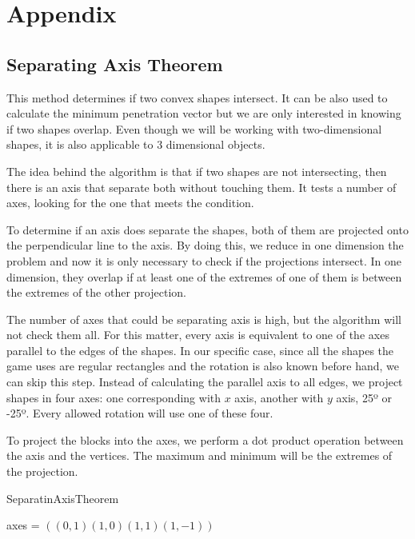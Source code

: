 \chapter{Appendix}\label{ch:appendix}

\section{Separating Axis Theorem}

This method determines if two convex shapes intersect. It can be also used to calculate the minimum penetration vector but we are only interested in knowing if two shapes overlap. Even though we will be working with two-dimensional shapes, it is also applicable to 3 dimensional objects. \cite{ericson2004real}

The idea behind the algorithm is that if two shapes are not intersecting, then there is an axis that separate both without touching them. It tests a number of axes, looking for the one that meets the condition. 

To determine if an axis does separate the shapes, both of them are projected onto the perpendicular line to the axis. By doing this, we reduce in one dimension the problem and now it is only necessary to check if the projections intersect. In one dimension, they overlap if at least one of the extremes of one of them is between the extremes of the other projection.

The number of axes that could be separating axis is high, but the algorithm will not check them all. For this matter, every axis is equivalent to one of the axes parallel to the edges of the shapes. In our specific case, since all the shapes the game uses are regular rectangles and the rotation is also known before hand, we can skip this step. Instead of calculating the parallel axis to all edges, we project shapes in four axes: one corresponding with $x$ axis, another with $y$ axis, 25º or -25º. Every allowed rotation will use one of these four. 

To project the blocks into the axes, we perform a dot product operation between the axis and the vertices. The maximum and minimum will be the extremes of the projection. 

\begin{algorithm}
	\caption{SeparatinAxisTheorem}
	\label{a:sat}

		axes = $((0,1)(1,0)(1,1)(1,-1))$\;
	
\end{algorithm}

